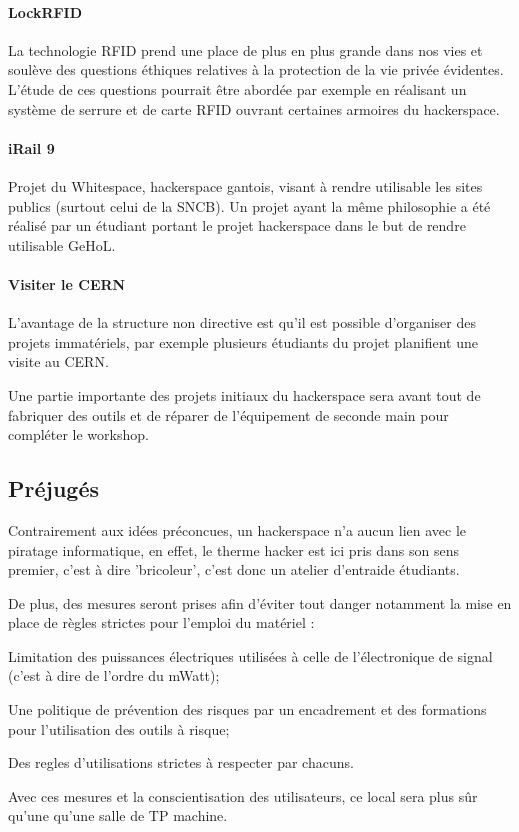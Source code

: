 \documentclass[a4paper]{article}
\begin{document}
\paragraph{LockRFID}  La technologie RFID prend une place de plus en plus grande dans nos  vies et soulève des questions éthiques relatives à la protection de  la vie privée évidentes. L’étude de ces questions pourrait être  abordée par exemple en réalisant un système de serrure et de carte  RFID ouvrant certaines armoires du hackerspace.

\paragraph{iRail 9}  Projet du Whitespace, hackerspace gantois, visant à rendre utilisable  les sites publics (surtout celui de la SNCB). Un projet ayant la même  philosophie a été réalisé par un étudiant portant le projet  hackerspace dans le but de rendre utilisable GeHoL.

\paragraph{Visiter le CERN}  L’avantage de la structure non directive est qu’il est possible  d’organiser des projets immatériels, par exemple plusieurs étudiants  du projet planifient une visite au CERN.

Une  partie importante des projets initiaux du hackerspace sera avant tout  de fabriquer des outils et de réparer de l’équipement de seconde main  pour compléter le workshop.


        \subsection*{Préjugés}
        Contrairement aux idées préconcues, un hackerspace n’a aucun lien avec le piratage informatique,  en effet, le therme hacker est ici pris dans son sens premier, c'est à  dire 'bricoleur', c'est donc un atelier d'entraide étudiants. 

\begin{list}{-}{}De  plus, des mesures seront prises afin d’éviter tout danger notamment la  mise en place de règles strictes pour l’emploi du matériel : 
\item Limitation des puissances électriques utilisées à celle de l'électronique de signal (c'est à dire de l'ordre du mWatt);
\item Une politique de prévention des risques par un encadrement et des formations pour l'utilisation des outils à risque;
\item Des regles d'utilisations strictes à respecter par chacuns. %
\end{list}
Avec ces mesures et la conscientisation des utilisateurs, ce local sera plus sûr qu'une qu’une salle de TP machine.
\end{document}
